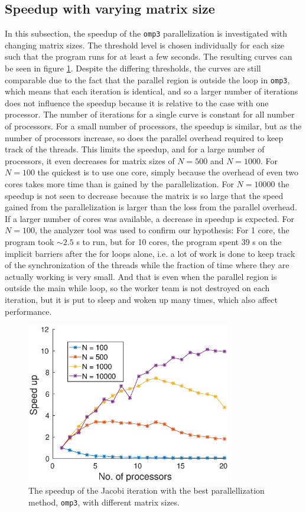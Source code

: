 \subsection{Speedup with varying matrix size}
In this subsection, the speedup of the \texttt{omp3} parallelization is investigated with changing matrix sizes. The threshold level is chosen individually for each size such that the program runs for at least a few seconds. The resulting curves can be seen in figure \ref{fig:speedup_N}. Despite the differing thresholds, the curves are still comparable due to the fact that the parallel region is outside the loop in \texttt{omp3}, which means that each iteration is identical, and so a larger number of iterations does not influence the speedup because it is relative to the case with one processor. The number of iterations for a single curve is constant for all number of processors. For a small number of processors, the speedup is similar, but as the number of processors increase, so does the parallel overhead required to keep track of the threads. This limits the speedup, and for a large number of processors, it even decreases for matrix sizes of $N = 500$ and $N = 1000$. For $N = 100$ the quickest is to use one core, simply because the overhead of even two cores takes more time than is gained by the parallelization. For $N = 10000$ the speedup is not seen to decrease because the matrix is so large that the speed gained from the parallelization is larger than the loss from the parallel overhead. If a larger number of cores was available, a decrease in speedup is expected. For $N = 100$, the analyzer tool was used to confirm our hypothesis: For 1 core, the program took $\sim 2.5$ s to run, but for 10 cores, the program spent 39 s on the implicit barriers after the for loops alone, i.e. a lot of work is done to keep track of the synchronization of the threads while the fraction of time where they are actually working is very small. And that is even when the parallel region is outside the main while loop, so the worker team is not destroyed on each iteration, but it is put to sleep and woken up many times, which also affect performance.
\begin{figure}
\centering
\includegraphics[width = 0.8\textwidth]{fig/speedup_N.eps}
\caption{The speedup of the Jacobi iteration with the best parallellization method, \texttt{omp3}, with different matrix sizes.}
\label{fig:speedup_N}
\end{figure}


